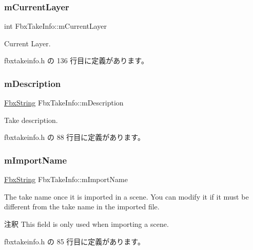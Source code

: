 \subsubsection{\texorpdfstring{m\+Current\+Layer}{mCurrentLayer}}
{\footnotesize\ttfamily int Fbx\+Take\+Info\+::m\+Current\+Layer}



Current Layer. 



 fbxtakeinfo.\+h の 136 行目に定義があります。

\mbox{\label{class_fbx_take_info_a1104cb914ad2cf041aa6b9cdd956e739}} 
\subsubsection{\texorpdfstring{m\+Description}{mDescription}}
{\footnotesize\ttfamily \hyperlink{class_fbx_string}{Fbx\+String} Fbx\+Take\+Info\+::m\+Description}



Take description. 



 fbxtakeinfo.\+h の 88 行目に定義があります。

\mbox{\label{class_fbx_take_info_ac767c10374a8759594b16aedafae83f9}} 
\subsubsection{\texorpdfstring{m\+Import\+Name}{mImportName}}
{\footnotesize\ttfamily \hyperlink{class_fbx_string}{Fbx\+String} Fbx\+Take\+Info\+::m\+Import\+Name}

The take name once it is imported in a scene. You can modify it if it must be different from the take name in the imported file. \begin{DoxyRemark}{注釈}
This field is only used when importing a scene. 
\end{DoxyRemark}


 fbxtakeinfo.\+h の 85 行目に定義があります。

\mbox{\label{class_fbx_take_info_a710e53c9ae01db3c19d895aee1d5b6cc}} 
